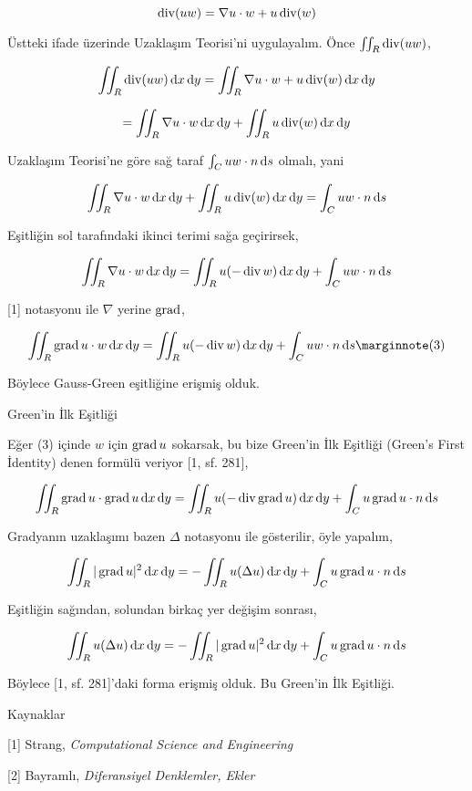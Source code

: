 \documentclass[12pt,fleqn]{article}\usepackage{../../common}
\begin{document}
$$
\operatorname{div} (uw) = \nabla u \cdot w + u \operatorname{div}(w)
$$

Üstteki ifade üzerinde Uzaklaşım Teorisi'ni uygulayalım. Önce
$\iint_R \operatorname{div} (uw)$,

$$
\iint_R \operatorname{div} (uw) \,\mathrm{d} x \,\mathrm{d} y= \iint_R \nabla u \cdot w + u \operatorname{div}(w) \,\mathrm{d} x \,\mathrm{d} y
$$

$$
= \iint_R \nabla u \cdot w  \,\mathrm{d} x \,\mathrm{d} y + \iint_R u \operatorname{div}(w) \,\mathrm{d} x \,\mathrm{d} y
$$

Uzaklaşım Teorisi'ne göre sağ taraf $\int_C uw \cdot n \,\mathrm{d} s$ olmalı, yani

$$
\iint_R \nabla u \cdot w  \,\mathrm{d} x \,\mathrm{d} y + \iint_R u \operatorname{div}(w) \,\mathrm{d} x \,\mathrm{d} y = \int_C uw \cdot n \,\mathrm{d} s
$$

Eşitliğin sol tarafındaki ikinci terimi sağa geçirirsek,

$$
\iint_R \nabla u \cdot w  \,\mathrm{d} x \,\mathrm{d} y =
\iint_R u (-\operatorname{div} w) \,\mathrm{d} x \,\mathrm{d} y + \int_C uw \cdot n \,\mathrm{d} s
$$

[1] notasyonu ile $\nabla$ yerine $\operatorname{grad}$,

$$
\iint_R \grad u \cdot w  \ud x \ud y =
\iint_R u (-\bdiv w) \ud x \ud y + \int_C uw \cdot n \ud s
\mlabel{3}
$$

Böylece Gauss-Green eşitliğine erişmiş olduk.

Green'in İlk Eşitliği 

Eğer (3) içinde $w$ için $\operatorname{grad} u$ sokarsak, bu bize Green'in İlk Eşitliği (Green's First
İdentity) denen formülü veriyor [1, sf. 281], 

$$
\iint_R \operatorname{grad} u \cdot \operatorname{grad} u  \,\mathrm{d} x \,\mathrm{d} y =
\iint_R u (-\operatorname{div} \operatorname{grad} u) \,\mathrm{d} x \,\mathrm{d} y + \int_C u \operatorname{grad} u \cdot n \,\mathrm{d} s
$$

Gradyanın uzaklaşımı bazen $\Delta$ notasyonu ile gösterilir, öyle yapalım,

$$
\iint_R | \operatorname{grad} u |^2  \,\mathrm{d} x \,\mathrm{d} y = - \iint_R u (\Delta u) \,\mathrm{d} x \,\mathrm{d} y +
\int_C u \operatorname{grad} u \cdot n \,\mathrm{d} s
$$

Eşitliğin sağından, solundan birkaç yer değişim sonrası,

$$
\iint_R u (\Delta u) \,\mathrm{d} x \,\mathrm{d} y =
- \iint_R | \operatorname{grad} u |^2  \,\mathrm{d} x \,\mathrm{d} y
+ \int_C u \operatorname{grad} u \cdot n \,\mathrm{d} s
$$

Böylece [1, sf. 281]'daki forma erişmiş olduk. Bu Green'in İlk Eşitliği.

Kaynaklar

[1] Strang, {\em Computational Science and Engineering}

[2] Bayramlı, {\em Diferansiyel Denklemler, Ekler}
\end{document}
